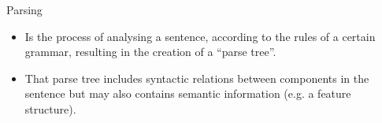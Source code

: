 \documentclass[11pt]{beamer}
\begin{document}
\begin{frame}
	\begin{block}{Parsing}
		\begin{itemize}
			\item Is the process of analysing a sentence, according to the rules of a certain grammar, resulting in the creation of a ``parse tree''.
			\pause
			\item That parse tree includes syntactic relations between components in the sentence but may also contains semantic information (e.g. a feature structure).
		\end{itemize}
	\end{block}
	\pause
\end{frame}
\end{document}
